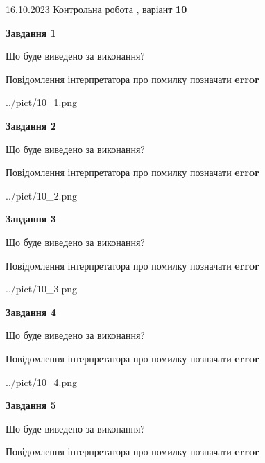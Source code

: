 \documentclass[12pt, ukrainian]{article}
\begin{document}
{\Large{16.10.2023 Контрольна робота , варіант  \No \textbf { 10 }\par}}
{
\begin {large}
{\begin {center}\textbf{Завдання 1}\end {center}}\par
Що буде виведено за виконання? \par
Повідомлення інтерпретатора про помилку позначати \textbf{error}

\begin{center}
	{../pict/10_1.png}
\end{center}
\newpage

{\begin {center}\textbf{Завдання 2}\end {center}}\par
Що буде виведено за виконання? \par
Повідомлення інтерпретатора про помилку позначати \textbf{error}

\begin{center}
	{../pict/10_2.png}
\end{center}
\newpage

{\begin {center}\textbf{Завдання 3}\end {center}}\par
Що буде виведено за виконання? \par
Повідомлення інтерпретатора про помилку позначати \textbf{error}

\begin{center}
	{../pict/10_3.png}
\end{center}
\newpage

{\begin {center}\textbf{Завдання 4}\end {center}}\par
Що буде виведено за виконання? \par
Повідомлення інтерпретатора про помилку позначати \textbf{error}

\begin{center}
	{../pict/10_4.png}
\end{center}
\newpage

{\begin {center}\textbf{Завдання 5}\end {center}}\par
Що буде виведено за виконання? \par
Повідомлення інтерпретатора про помилку позначати \textbf{error}


\end{large}}
\end{document}
